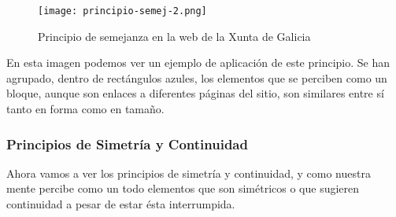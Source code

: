 \begin{itemize}
    \begin{figure}[H]
        \centering
        \texttt{[image: principio-semej-2.png]}
        \caption{Principio de semejanza en la web de la Xunta de Galicia}
    \end{figure}

    En esta imagen podemos ver un ejemplo de aplicación de este principio. Se han agrupado, dentro de rectángulos azules, los elementos que se perciben como un bloque, aunque son enlaces a diferentes páginas del sitio, son similares entre sí tanto en forma como en tamaño.
\end{itemize}

\subsubsection{Principios de Simetría y Continuidad}
Ahora vamos a ver los principios de simetría y continuidad, y como nuestra mente percibe como un todo elementos que son simétricos o que sugieren continuidad a pesar de estar ésta interrumpida.

